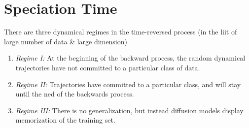 \documentclass[12pt,fleqn]{article}
\numberwithin{equation}{section} %
\begin{document}
\section{Speciation Time}

There are three dynamical regimes in the time-reversed process (in the liit of large number of data \& large dimension)
\begin{enumerate}
	\item \emph{Regime I:} At the beginning of the backward process, the random dynamical trajectories have not committed to a particular class of data.
	\item \emph{Regime II:} Trajectories have committed to a particular class, and will stay until the ned of the backwards process.
	\item \emph{Regime III:} There is no generalization, but instead diffusion models display memorization of the training set.
\end{enumerate}
\end{document}
